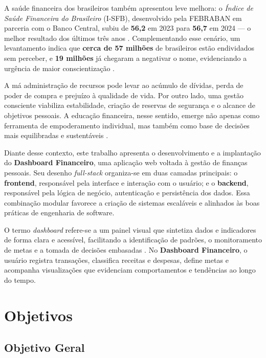 A saúde financeira dos brasileiros também apresentou leve melhora: o \textit{Índice de Saúde Financeira do Brasileiro} (I\hyp SFB), desenvolvido pela FEBRABAN em parceria com o Banco Central, subiu de \textbf{56{,}2} em 2023 para \textbf{56{,}7} em 2024 — o melhor resultado dos últimos três anos \cite{BCB2024,ISFB2024}. Complementando esse cenário, um levantamento indica que \textbf{cerca de 57 milhões} de brasileiros estão endividados sem perceber, e \textbf{19 milhões} já chegaram a negativar o nome, evidenciando a urgência de maior conscientização \cite{SERASA2025INFO}.

A má administração de recursos pode levar ao acúmulo de dívidas, perda de poder de compra e prejuízo à qualidade de vida. Por outro lado, uma gestão consciente viabiliza estabilidade, criação de reservas de segurança e o alcance de objetivos pessoais. A educação financeira, nesse sentido, emerge não apenas como ferramenta de empoderamento individual, mas também como base de decisões mais equilibradas e sustentáveis \cite{ANBIMA2024}.

Diante desse contexto, este trabalho apresenta o desenvolvimento e a implantação do \textbf{Dashboard Financeiro}, uma aplicação web voltada à gestão de finanças pessoais. Seu desenho \textit{full\hyp stack} organiza-se em duas camadas principais: o \textbf{frontend}, responsável pela interface e interação com o usuário; e o \textbf{backend}, responsável pela lógica de negócio, autenticação e persistência dos dados. Essa combinação modular favorece a criação de sistemas escaláveis e alinhados às boas práticas de engenharia de software.

O termo \textit{dashboard} refere-se a um painel visual que sintetiza dados e indicadores de forma clara e acessível, facilitando a identificação de padrões, o monitoramento de metas e a tomada de decisões embasadas \cite{MUNZNER2014,FEW2017}. No \textbf{Dashboard Financeiro}, o usuário registra transações, classifica receitas e despesas, define metas e acompanha visualizações que evidenciam comportamentos e tendências ao longo do tempo.

\section{Objetivos}

\subsection{Objetivo Geral}

